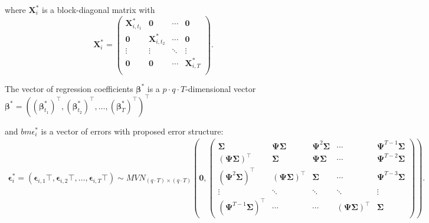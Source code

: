 \documentclass{article}
\begin{document}
where $\bm{X}_{i}^{*}$ is a block-diagonal matrix with
$$\bm{X}_{i}^{*} = \begin{pmatrix}\bm X_{i,t_1}^* & \bm 0 & \cdots & \bm 0\\
\bm 0 & \bm X_{i,t_2}^* & \cdots & \bm 0\\
\vdots & \vdots & \ddots & \vdots\\
\bm 0 & \bm 0 & \cdots & \bm X_{i,T}^*\\
\end{pmatrix}.
$$

The vector of regression coefficients $\bm \beta^{*}$ is a $p\cdot q \cdot T$-dimensional vector  $\bm \beta^{*} =((\bm{\beta}_{t_1}^*)^\top, (\bm{\beta}_{t_2}^*)^\top, \ldots, (\bm{\beta}_{T}^*)^\top)^\top$




and $bm\epsilon_i^*$ is a vector of errors with proposed error structure:
\begin{align*}
\bm\epsilon_i^* = (\bm \epsilon_{i,1}\top, \bm  \epsilon_{i,2}\top, \ldots, \bm \epsilon_{i,T}\top) \sim MVN_{(q\cdot T)\times (q\cdot T)} \left( \bm 0, \begin{pmatrix}
\bm \Sigma  & \bm \Psi \bm \Sigma & \bm \Psi^2 \bm \Sigma & \cdots  & \bm \Psi^{T-1} \bm \Sigma\\
(\bm \Psi \bm \Sigma)^\top & \bm \Sigma  & \bm \Psi \bm \Sigma  & \cdots & \bm \Psi^{T-2} \bm \Sigma\\
(\bm \Psi^2 \bm \Sigma)^\top & (\bm \Psi \bm \Sigma)^\top & \bm \Sigma & \cdots & \bm \Psi^{T-3} \bm \Sigma\\
\vdots & \ddots &  \ddots & \ddots & \vdots\\
(\bm \Psi^{T-1} \bm \Sigma)^\top & \cdots & \cdots & (\bm \Psi \bm \Sigma)^\top & \bm \Sigma
\end{pmatrix}
\right).
\end{align*}
\end{document}
